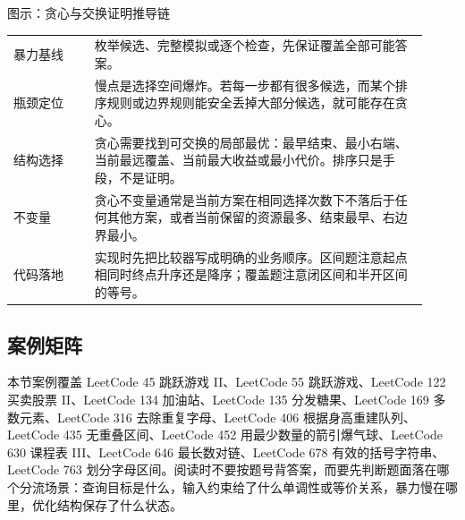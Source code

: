 \begin{principlebox}{图示：贪心与交换证明推导链}
\begin{tabular}{@{}p{0.18\linewidth}p{0.74\linewidth}@{}}
暴力基线 & 枚举候选、完整模拟或逐个检查，先保证覆盖全部可能答案。\\
瓶颈定位 & 慢点是选择空间爆炸。若每一步都有很多候选，而某个排序规则或边界规则能安全丢掉大部分候选，就可能存在贪心。\\
结构选择 & 贪心需要找到可交换的局部最优：最早结束、最小右端、当前最远覆盖、当前最大收益或最小代价。排序只是手段，不是证明。\\
不变量 & 贪心不变量通常是当前方案在相同选择次数下不落后于任何其他方案，或者当前保留的资源最多、结束最早、右边界最小。\\
代码落地 & 实现时先把比较器写成明确的业务顺序。区间题注意起点相同时终点升序还是降序；覆盖题注意闭区间和半开区间的等号。\\
\end{tabular}
\end{principlebox}

\subsection{案例矩阵}

本节案例覆盖 LeetCode 45 跳跃游戏 II、LeetCode 55 跳跃游戏、LeetCode 122 买卖股票 II、LeetCode 134 加油站、LeetCode 135 分发糖果、LeetCode 169 多数元素、LeetCode 316 去除重复字母、LeetCode 406 根据身高重建队列、LeetCode 435 无重叠区间、LeetCode 452 用最少数量的箭引爆气球、LeetCode 630 课程表 III、LeetCode 646 最长数对链、LeetCode 678 有效的括号字符串、LeetCode 763 划分字母区间。阅读时不要按题号背答案，而要先判断题面落在哪个分流场景：查询目标是什么，输入约束给了什么单调性或等价关系，暴力慢在哪里，优化结构保存了什么状态。

